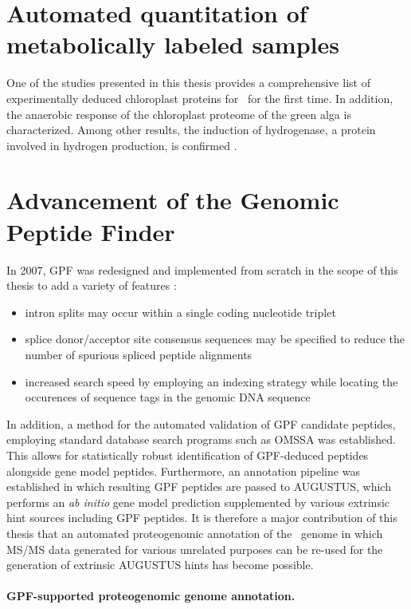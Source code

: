 \section{Automated quantitation of metabolically labeled samples}

One of the studies presented in this thesis provides a comprehensive list of 
experimentally deduced chloroplast proteins for \cre~for the first time.
In addition, the anaerobic response of the chloroplast proteome of the green 
alga is characterized. 
Among other results, the induction of hydrogenase, a protein involved in 
hydrogen production, is confirmed \citep{Terashima2010}.

\section{Advancement of the Genomic Peptide Finder }

In 2007, GPF was redesigned and implemented from scratch in the scope of this
thesis to add a variety of features \citep{Specht2011_GPF}:

\begin{itemize}
\item intron splits may occur within a single coding nucleotide triplet
\item splice donor/acceptor site consensus sequences may be specified to
reduce the number of spurious spliced peptide alignments
\item increased search speed by employing an indexing strategy while locating
the occurences of sequence tags in the genomic DNA sequence
\end{itemize}

In addition, a method for the automated validation of GPF candidate peptides,
employing standard database search programs such as OMSSA was established.
This allows for statistically robust identification of GPF-deduced peptides
alongside gene model peptides.
Furthermore, an annotation pipeline was established in which resulting GPF
peptides are passed to AUGUSTUS, which performs an {\em ab initio} gene 
model prediction supplemented by various extrinsic hint sources including
GPF peptides.
It is therefore a major contribution of this thesis that an automated
proteogenomic annotation of the \cre~genome in which MS/MS data generated
for various unrelated purposes can be re-used for the generation of
extrinsic AUGUSTUS hints has become possible.

\paragraph{GPF-supported proteogenomic genome annotation.}

